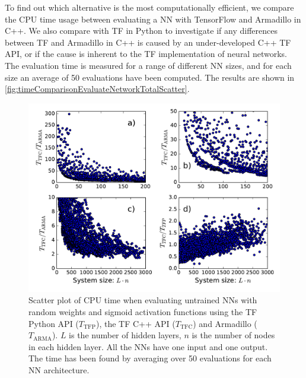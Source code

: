 \documentclass[twoside,english]{uiofysmaster}
\begin{document}
To find out which alternative is the most computationally efficient, we compare the 
CPU time usage between evaluating a NN with TensorFlow and Armadillo in C++. We also compare with TF in Python to 
investigate if any differences between TF and Armadillo in C++ is caused by an under-developed C++ TF API, or 
if the cause is inherent to the TF implementation of neural networks.
The evaluation time 
is measured for a range of different NN sizes, and for each size an average of 50 evaluations have been computed.
The results are shown in \autoref{fig:timeComparisonEvaluateNetworkTotalScatter}.
\begin{figure}
\centering
  \includegraphics[width = 0.9\linewidth]{Figures/Tests/timeComparisonNetworkNew.pdf}
  \caption{Scatter plot of CPU time when evaluating untrained NNs with random weights and sigmoid activation functions
	   using the TF Python API ($T_{\mathrm{TFP}}$), the TF C++ API ($T_{\mathrm{TFC}}$) and Armadillo ($T_{\mathrm{ARMA}}$). 
	   $L$ is the number of hidden layers, $n$ is the number of nodes in each hidden layer. All the NNs
	   have one input and one output. The time has been found by averaging over 50 evaluations
	   for each NN architecture.}
\label{fig:timeComparisonEvaluateNetworkTotalScatter}
\end{figure}
\end{document}

